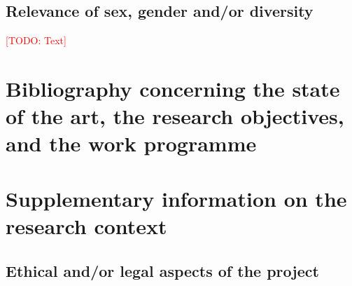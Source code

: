 \documentclass[american,firsttime]{dfgproposal}
\newcommand{\todo}[1]{\xspace{\textcolor{red}{[TODO: #1]}}\xspace}
\begin{document}
	
	\subsection{Relevance of sex, gender and/or diversity}
	\todo{Text}
	
	\section{Bibliography concerning the state of the art, the research objectives, and the work programme}
	\label{sec:bib}
	\newrefcontext
	\printbibliography[notcategory=reviewed, notcategory=nonreviewed, notcategory=patents_pending, notcategory=patents, heading=none]
	
	
	\clearpage
	
	
	\section{Supplementary information on the research context}
	
	\subsection{Ethical and/or legal aspects of the project}
	
\end{document}
